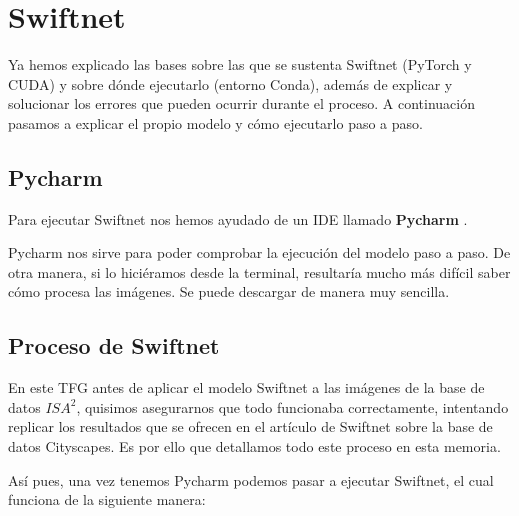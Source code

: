 \section{Swiftnet}

Ya hemos explicado las bases sobre las que se sustenta Swiftnet (PyTorch y CUDA) y sobre dónde ejecutarlo (entorno Conda), además de explicar y solucionar los errores que pueden ocurrir durante el proceso. A continuación pasamos a explicar el propio modelo y cómo ejecutarlo paso a paso.
\subsection{Pycharm}

Para ejecutar Swiftnet nos hemos ayudado de un \ac{IDE} llamado \textbf{Pycharm} \cite{pycharm}.

Pycharm nos sirve para poder comprobar la ejecución del modelo paso a paso. De otra manera, si lo hiciéramos desde la terminal, resultaría mucho más difícil saber cómo procesa las imágenes. Se puede descargar de manera muy sencilla.

\subsection{Proceso de Swiftnet}
En este TFG antes de aplicar el modelo Swiftnet a las imágenes de la base de datos $ISA^2$, quisimos asegurarnos que todo funcionaba correctamente, intentando replicar los resultados que se ofrecen en el artículo de Swiftnet \cite{swiftnet} sobre la base de datos Cityscapes. Es por ello que detallamos todo este proceso en esta memoria.

Así pues, una vez tenemos Pycharm podemos pasar a ejecutar Swiftnet, el cual funciona de la siguiente manera:

